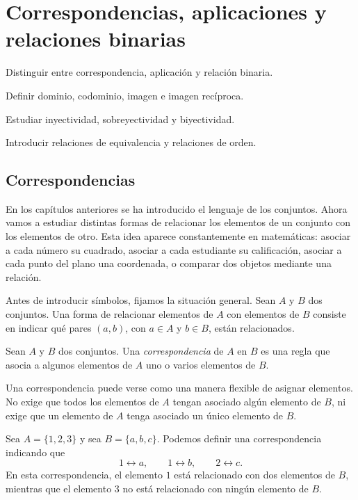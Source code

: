 \chapter{Correspondencias, aplicaciones y relaciones binarias}

\begin{objetivos}
  \item Distinguir entre correspondencia, aplicación y relación binaria.
  \item Definir dominio, codominio, imagen e imagen recíproca.
  \item Estudiar inyectividad, sobreyectividad y biyectividad.
  \item Introducir relaciones de equivalencia y relaciones de orden.
\end{objetivos}

\section{Correspondencias}

En los capítulos anteriores se ha introducido el lenguaje de los conjuntos. Ahora vamos a estudiar distintas formas de relacionar los elementos de un conjunto con los elementos de otro. Esta idea aparece constantemente en matemáticas: asociar a cada número su cuadrado, asociar a cada estudiante su calificación, asociar a cada punto del plano una coordenada, o comparar dos objetos mediante una relación.

Antes de introducir símbolos, fijamos la situación general. Sean \(A\) y \(B\) dos conjuntos. Una forma de relacionar elementos de \(A\) con elementos de \(B\) consiste en indicar qué pares \((a,b)\), con \(a\in A\) y \(b\in B\), están relacionados.

\begin{definicion}[Correspondencia]
Sean \(A\) y \(B\) dos conjuntos. Una \emph{correspondencia} de \(A\) en \(B\) es una regla que asocia a algunos elementos de \(A\) uno o varios elementos de \(B\).
\end{definicion}

Una correspondencia puede verse como una manera flexible de asignar elementos. No exige que todos los elementos de \(A\) tengan asociado algún elemento de \(B\), ni exige que un elemento de \(A\) tenga asociado un único elemento de \(B\).

\begin{ejemplo}
Sea \(A=\{1,2,3\}\) y sea \(B=\{a,b,c\}\). Podemos definir una correspondencia indicando que
\[
1 \longleftrightarrow a,\qquad
1 \longleftrightarrow b,\qquad
2 \longleftrightarrow c.
\]
En esta correspondencia, el elemento \(1\) está relacionado con dos elementos de \(B\), mientras que el elemento \(3\) no está relacionado con ningún elemento de \(B\).
\end{ejemplo}


